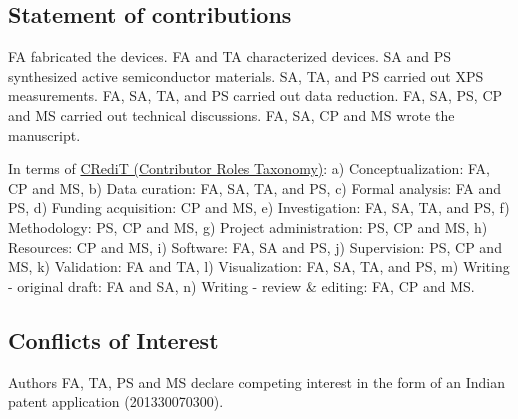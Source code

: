 \documentclass[12pt,twocolumn]{article}
\begin{document}
\subsection*{Statement of contributions}

FA fabricated the devices. FA and TA characterized devices. SA and PS synthesized active semiconductor materials. SA, TA, and PS carried out XPS measurements. FA, SA, TA, and PS carried out data reduction. FA, SA, PS, CP and MS carried out technical discussions. FA, SA, CP and MS wrote the manuscript.

In terms of \href{https://casrai.org/credit/}{CRediT (Contributor Roles Taxonomy)}: a) Conceptualization: FA, CP and MS, b) Data curation: FA, SA, TA, and PS, c) Formal analysis: FA and PS, d) Funding acquisition: CP and MS, e) Investigation: FA, SA, TA, and PS, f) Methodology: PS, CP and MS, g) Project administration: PS, CP and MS, h) Resources: CP and MS, i) Software: FA, SA and PS, j) Supervision: PS, CP and MS, k) Validation: FA and TA, l) Visualization: FA, SA, TA, and PS, m) Writing - original draft: FA and SA, n) Writing - review \& editing: FA, CP and MS.

\subsection*{Conflicts of Interest}
Authors FA, TA, PS and MS declare competing interest in the form of an Indian patent application (201330070300).



\end{document}
